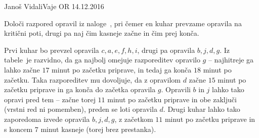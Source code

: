 \begin{naloga}{Janoš Vidali}{Vaje OR 14.12.2016}
\begin{vprasanje}
Določi razpored opravil iz naloge~\nal[palacinke],
pri čemer en kuhar prevzame opravila na kritični poti,
drugi pa naj čim kasneje začne in čim prej konča.
\end{vprasanje}

\begin{odgovor}
Prvi kuhar bo prevzel opravila $c, a, e, f, h, i$,
drugi pa opravila $b, j, d, g$.
Iz tabele~ je razvidno,
da ga najbolj omejuje razporeditev opravilo $g$
-- najhitreje ga lahko začne $17$ minut po začetku priprave,
in tedaj ga konča $18$ minut po začetku.
Taka razporeditev mu dovoljuje,
da z opravilom $d$ začne $15$ minut po začetku priprave
in ga konča do začetka opravila $g$.
Opravili $b$ in $j$ lahko tako opravi pred tem
-- začne torej $11$ minut po začetku priprave
in obe zaključi (vrstni red ni pomemben),
preden se loti opravila $d$.
Drugi kuhar lahko tako zaporedoma izvede opravila $b, j, d, g$,
z začetkom $11$ minut po začetku priprave in s koncem $7$ minut kasneje
(torej brez prestanka).
\end{odgovor}
\end{naloga}
